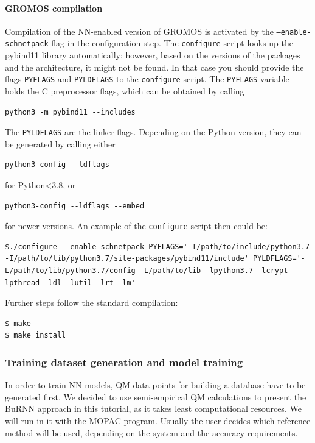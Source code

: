 \paragraph{GROMOS compilation}
Compilation of the NN-enabled version of GROMOS is activated by the \texttt{--enable-schnetpack} flag in the configuration step. The \texttt{configure} script looks up the pybind11 library automatically; however, based on the versions of the packages and the architecture, it might not be found. In that case you should provide the flags \texttt{PYFLAGS} and \texttt{PYLDFLAGS} to the \texttt{configure} script. The \texttt{PYFLAGS} variable holds the C preprocessor flags, which can be obtained by calling

\begin{lstlisting}[breaklines=true, breakatwhitespace=false]
python3 -m pybind11 --includes
\end{lstlisting}

The \texttt{PYLDFLAGS} are the linker flags. Depending on the Python version, they can be generated by calling either 

\begin{lstlisting}[breaklines=true, breakatwhitespace=false]
python3-config --ldflags
\end{lstlisting}

for Python<3.8, or 

\begin{lstlisting}[breaklines=true, breakatwhitespace=false]
python3-config --ldflags --embed
\end{lstlisting}

for newer versions. An example of the \texttt{configure} script then could be:
\begin{lstlisting}[breaklines=true, breakatwhitespace=false]
$./configure --enable-schnetpack PYFLAGS='-I/path/to/include/python3.7 -I/path/to/lib/python3.7/site-packages/pybind11/include' PYLDFLAGS='-L/path/to/lib/python3.7/config -L/path/to/lib -lpython3.7 -lcrypt -lpthread -ldl -lutil -lrt -lm'
\end{lstlisting}

Further steps follow the standard compilation:
\begin{lstlisting}[breaklines=true, breakatwhitespace=false]
$ make
$ make install
\end{lstlisting}


\subsubsection{Training dataset generation and model training}
In order to train NN models, QM data points for building a database have to be generated first. We decided to use semi-empirical QM calculations to present the BuRNN approach in this tutorial, as it takes least computational resources. We will run in it with the MOPAC \cite{Stewart1990MOPAC, Stewart2013MOPAC} program. Usually the user decides which reference method will be used, depending on the system and the accuracy requirements.

